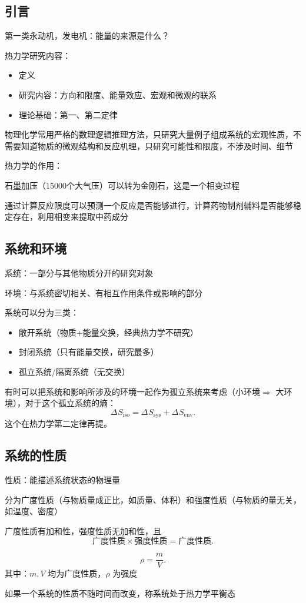 \subsection{引言}%
\label{sub:引言}
第一类永动机，发电机：能量的来源是什么？

热力学研究内容：
\begin{itemize}
    \item 定义
    \item 研究内容：方向和限度、能量效应、宏观和微观的联系
    \item 理论基础：第一、第二定律
\end{itemize}
物理化学常用严格的数理逻辑推理方法，只研究大量例子组成系统的宏观性质，不需要知道物质的微观结构和反应机理，只研究可能性和限度，不涉及时间、细节

热力学的作用：
\begin{eg}
    石墨加压（15000个大气压）可以转为金刚石，这是一个相变过程
\end{eg}
通过计算反应限度可以预测一个反应是否能够进行，计算药物制剂辅料是否能够稳定存在，利用相变来提取中药成分
\subsection{系统和环境}%
\label{sub:系统和环境}
\begin{defi}
    系统：一部分与其他物质分开的研究对象
\end{defi}
\begin{defi}
    环境：与系统密切相关、有相互作用条件或影响的部分
\end{defi}
系统可以分为三类：
\begin{itemize}
    \item 敞开系统（物质+能量交换，经典热力学不研究）
    \item 封闭系统（只有能量交换，研究最多）
    \item 孤立系统/隔离系统（无交换）
    
\end{itemize}
有时可以把系统和影响所涉及的环境一起作为孤立系统来考虑（小环境$\Rightarrow $ 大环境），对于这个孤立系统的熵：\[
    \Delta_\text{}S_{\text{iso}} = \Delta_\text{}S_{\text{sys}} + \Delta_\text{}S_{\text{env}}   
.\]
这个在热力学第二定律再提。
\subsection{系统的性质}%
\label{sub:系统的性质}
\begin{defi}
    性质：能描述系统状态的物理量
\end{defi}
分为广度性质（与物质量成正比，如质量、体积）和强度性质（与物质的量无关，如温度、密度）
\begin{notation}
    广度性质有加和性，强度性质无加和性，且\[
        \text{广度性质}\times \text{强度性质}=\text{广度性质}
    .\]
\end{notation}
\begin{eg}
    \[
        \rho = \frac{m}{V}
    .\]
    其中：$m,V$ 均为广度性质，$\rho$ 为强度
\end{eg}
如果一个系统的性质不随时间而改变，称系统处于热力学平衡态
